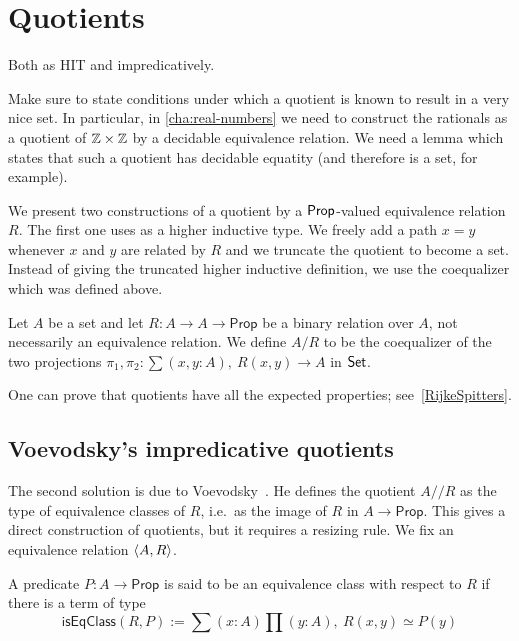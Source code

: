 \section{Quotients}
\label{sec:quotients}

Both as HIT and impredicatively.

Make sure to state conditions under which a quotient is known to result in a very nice
set. In particular, in \autoref{cha:real-numbers} we need to construct the rationals \Q as
a quotient of $\mathbb{Z} \times \mathbb{Z}$ by a decidable equivalence relation. We need a lemma which
states that such a quotient has decidable equatity (and therefore is a set, for example).


We present two constructions of a quotient by a $\mathsf{Prop}$-valued equivalence relation $R$. 
The first one uses as a higher inductive type. We freely add a path $x= y$ whenever $x$ 
and $y$ are related by $R$ and we truncate the quotient to become a set.
Instead of giving the truncated higher inductive definition, we use the coequalizer which was defined above.

\begin{defn}
Let $A$ be a set and let $R:A\to A\to\mathsf{Prop}$ be a binary relation over
$A$, not necessarily an equivalence relation. 
We define $A/R$ to be the coequalizer of the two projections
$\pi_1,\pi_2:\sum(x,y:A),\ R(x,y)\to A$ in $\mathsf{Set}$.
\end{defn} 

One can prove that quotients have all the expected properties; see~\ref{RijkeSpitters}.

\subsection{Voevodsky's impredicative quotients}\label{sec:resizing}
The second solution is due to Voevodsky~\cite{pelayo2013preliminary}.
He defines the quotient $A//R $ as the type of equivalence classes of $R$, 
i.e.\ as the image of $R$ in $A\to\mathsf{Prop}$. This gives a direct
construction of quotients, but it requires a resizing rule. We fix an equivalence relation ${\langle A,R\rangle}$.

\begin{defn}
A predicate $P:A\to\mathsf{Prop}$ is said to be an equivalence class with 
respect to $R $ if there is a term of type
\begin{equation*}
\mathsf{isEqClass}(R ,P):=\sum(x:A)\prod(y:A),\ R (x,y)\simeq P(y)
\end{equation*}
\end{defn}

